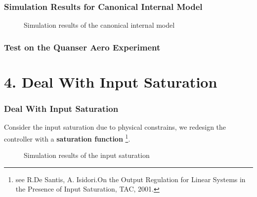 \documentclass{beamer}
\begin{document}
\begin{frame}[fragile]
    \frametitle{{\color{red} Simulation Results for Canonical Internal Model}}
    \begin{figure}[h]
     \centering
     \caption{Simulation results of the canonical internal model}
     \label{fig:subfig}
    \end{figure}

\end{frame}


\begin{frame}[fragile]
	\frametitle{{\color{red} Test on the Quanser Aero Experiment}}
	
\end{frame}



\section{\large 4. Deal With Input Saturation}

\begin{frame}[fragile]
    \frametitle{{\color{red} Deal With Input Saturation}}
Consider the input saturation due to physical constrains, we redesign the controller with a \textbf{saturation function} \footnote{see R.De Santis, A. Isidori.On the Output Regulation for Linear Systems in the Presence of Input Saturation, TAC, 2001.}.
    \begin{figure}[h]
     \centering
     \caption{Simulation results of the input saturation}
     \label{fig:subfig}
    \end{figure}
\end{frame}
\end{document}
